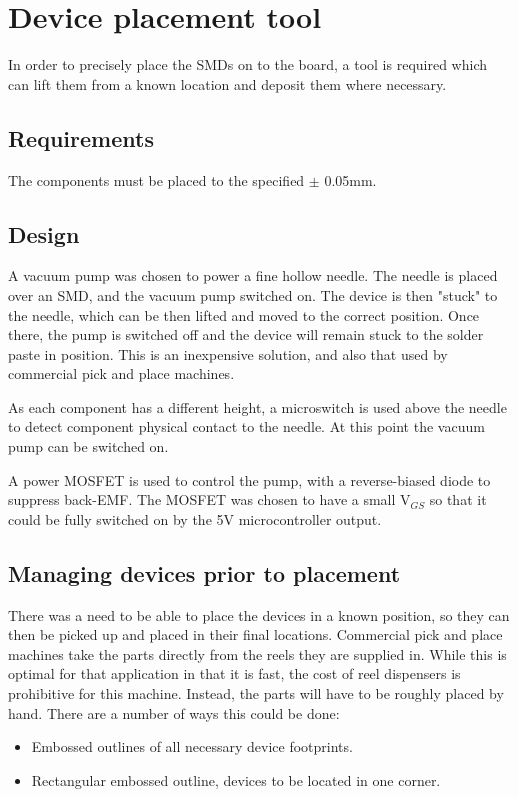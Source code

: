 \section{Device placement tool}
In order to precisely place the SMDs on to the board, a tool is required
which can lift them from a known location and deposit them where necessary.

\subsection{Requirements}
The components must be placed to the specified $\pm$ 0.05mm.

\subsection{Design}
A vacuum pump was chosen to power a fine hollow needle. The needle
is placed over an SMD, and the vacuum pump switched on. The device
is then "stuck" to the needle, which can be then lifted and moved to
the correct position. Once there, the pump is switched off and the
device will remain stuck to the solder paste in position. This is an
inexpensive solution, and also that used by commercial pick and place
machines.

As each component has a different height, a microswitch is used above
the needle to detect component physical contact to the needle. At this
point the vacuum pump can be switched on.

A power MOSFET is used to control the pump, with a reverse-biased
diode to suppress back-EMF. The MOSFET was chosen to have a small V$_{GS}$
so that it could be fully switched on by the 5V microcontroller output.


\subsection{Managing devices prior to placement}
There was a need to be able to place the devices in a known position, so they can then be picked up and placed in their final locations.
Commercial pick and place machines take the parts directly from the reels they are supplied in. While this is optimal for that application in that
it is fast, the cost of reel dispensers is prohibitive for this machine. Instead, the parts will have to be roughly placed
by hand. There are a number of ways this could be done:

\begin{itemize} \itemsep0em
	\item	Embossed outlines of all necessary device footprints.
	\item	Rectangular embossed outline, devices to be located in one corner.
\end{itemize}

